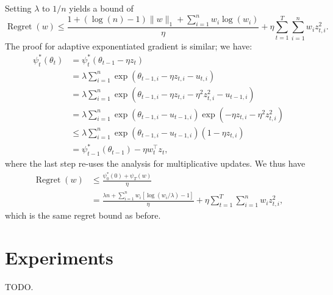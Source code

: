 \documentclass[11pt]{article}
\DeclareMathOperator{\Regret}{Regret}
\begin{document}
Setting $\lambda$ to $1/n$ yields a bound of
\[ \Regret(w) \leq \frac{1+(\log(n)-1)\|w\|_1 + \sum_{i=1}^n w_i\log(w_i)}{\eta} + \eta \sum_{t=1}^T \sum_{i=1}^n w_i z_{t,i}^2. \]
The proof for adaptive exponentiated gradient is similar; we have:
\begin{align}
\psi_t^*(\theta_t) &= \psi_t^*(\theta_{t-1} - \eta z_t) \\
 &= \lambda \sum_{i=1}^n \exp\left(\theta_{t-1,i} - \eta z_{t,i} - u_{t,i}\right) \\
 &= \lambda \sum_{i=1}^n \exp\left(\theta_{t-1,i} - \eta z_{t,i} - \eta^2 z_{t,i}^2 - u_{t-1,i}\right) \\
 &= \lambda \sum_{i=1}^n \exp\left(\theta_{t-1,i} - u_{t-1,i}\right)\exp(-\eta z_{t,i} - \eta^2 z_{t,i}^2) \\
 &\leq \lambda \sum_{i=1}^n \exp\left(\theta_{t-1,i} - u_{t-1,i}\right)(1-\eta z_{t,i}) \\
 &= \psi_{t-1}^*(\theta_{t-1}) - \eta w_t^{\top}z_t,
\end{align}
where the last step re-uses the analysis for multiplicative updates. We thus have
\begin{align}
\Regret(w) &\leq \frac{\psi_0^*(0) + \psi_T(w)}{\eta} \\
 &= \frac{\lambda n + \sum_{i=1}^n w_i[\log(w_i/\lambda)-1]}{\eta} + \eta \sum_{t=1}^T \sum_{i=1}^n w_i z_{t,i}^2,
\end{align}
which is the same regret bound as before.
\section{Experiments}
TODO.
\end{document}
